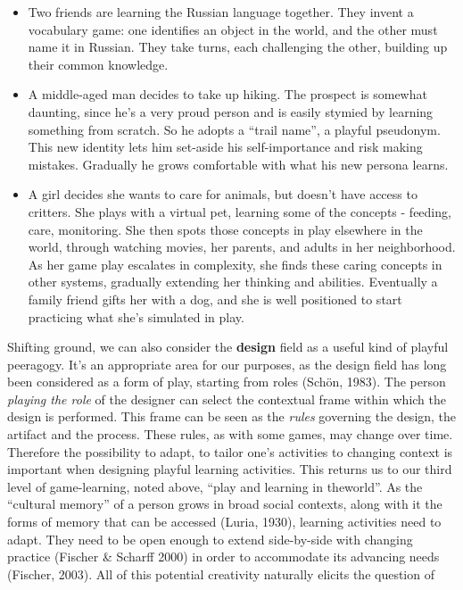 \begin{itemize}
\item
  Two friends are learning the Russian language together. They invent a
  vocabulary game: one identifies an object in the world, and the other
  must name it in Russian. They take turns, each challenging the other,
  building up their common knowledge.
\item
  A middle-aged man decides to take up hiking. The prospect is somewhat
  daunting, since he's a very proud person and is easily stymied by
  learning something from scratch. So he adopts a ``trail name'', a
  playful pseudonym. This new identity lets him set-aside his
  self-importance and risk making mistakes. Gradually he grows
  comfortable with what his new persona learns.
\item
  A girl decides she wants to care for animals, but doesn't have access
  to critters. She plays with a virtual pet, learning some of the
  concepts - feeding, care, monitoring. She then spots those concepts in
  play elsewhere in the world, through watching movies, her parents, and
  adults in her neighborhood. As her game play escalates in complexity,
  she finds these caring concepts in other systems, gradually extending
  her thinking and abilities. Eventually a family friend gifts her with
  a dog, and she is well positioned to start practicing what she's
  simulated in play.
\end{itemize}
Shifting ground, we can also consider the \textbf{design} field as a
useful kind of playful peeragogy. It's an appropriate area for our
purposes, as the design field has long been considered as a form of
play, starting from roles (Schön, 1983). The person \emph{playing the
role} of the designer can select the contextual frame within which the
design is performed. This frame can be seen as the \emph{rules}
governing the design, the artifact and the process. These rules, as with
some games, may change over time. Therefore the possibility to adapt, to
tailor one's activities to changing context is important when designing
playful learning activities. This returns us to our third level of
game-learning, noted above, ``play and learning in theworld''. As the
``cultural memory'' of a person grows in broad social contexts, along
with it the forms of memory that can be accessed (Luria, 1930), learning
activities need to adapt. They need to be open enough to extend
side-by-side with changing practice (Fischer \& Scharff 2000) in order
to accommodate its advancing needs (Fischer, 2003). All of this
potential creativity naturally elicits the question of
